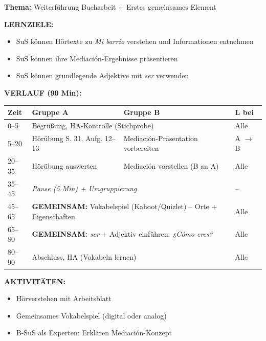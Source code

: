 \documentclass[11pt, a4paper]{article}
\newcommand{\es}[1]{\textcolor{spanisch}{\textit{#1}}}
\begin{document}
\begin{dsbox}[title={DS 2 -- Fortführung + Übergang (Di, 06.01.2026)}]

\textbf{Thema:} Weiterführung Bucharbeit + Erstes gemeinsames Element

\vspace{0.3cm}

\textbf{LERNZIELE:}
\begin{itemize}[leftmargin=1.5em, nosep]
    \item[\textcolor{gruppeA}{A:}] SuS können Hörtexte zu \es{Mi barrio} verstehen und Informationen entnehmen
    \item[\textcolor{gruppeB}{B:}] SuS können ihre Mediación-Ergebnisse präsentieren
    \item[Alle:] SuS können grundlegende Adjektive mit \es{ser} verwenden
\end{itemize}

\vspace{0.2cm}

\textbf{VERLAUF (90 Min):}

\begin{tabular}{|p{1.2cm}|p{5.5cm}|p{5.5cm}|p{1.5cm}|}
\hline
\rowcolor{hellgrau}
\textbf{Zeit} & \textbf{Gruppe A} & \textbf{Gruppe B} & \textbf{L bei} \\
\hline
0--5 & \multicolumn{2}{l|}{Begrüßung, HA-Kontrolle (Stichprobe)} & Alle \\
\hline
5--20 & Hörübung S. 31, Aufg. 12--13 & Mediación-Präsentation vorbereiten & A $\rightarrow$ B \\
\hline
20--35 & Hörübung auswerten & Mediación vorstellen (B an A) & Alle \\
\hline
35--45 & \multicolumn{2}{l|}{\textit{Pause (5 Min) + Umgruppierung}} & -- \\
\hline
45--65 & \multicolumn{2}{l|}{\textbf{GEMEINSAM:} Vokabelspiel (Kahoot/Quizlet) -- Orte + Eigenschaften} & Alle \\
\hline
65--80 & \multicolumn{2}{l|}{\textbf{GEMEINSAM:} \es{ser} + Adjektiv einführen: \es{¿Cómo eres?}} & Alle \\
\hline
80--90 & \multicolumn{2}{l|}{Abschluss, HA (Vokabeln lernen)} & Alle \\
\hline
\end{tabular}

\vspace{0.2cm}

\textbf{AKTIVITÄTEN:}
\begin{itemize}[leftmargin=1.5em, nosep]
    \item Hörverstehen mit Arbeitsblatt
    \item Gemeinsames Vokabelspiel (digital oder analog)
    \item B-SuS als Experten: Erklären Mediación-Konzept
\end{itemize}


\end{dsbox}
\end{document}
